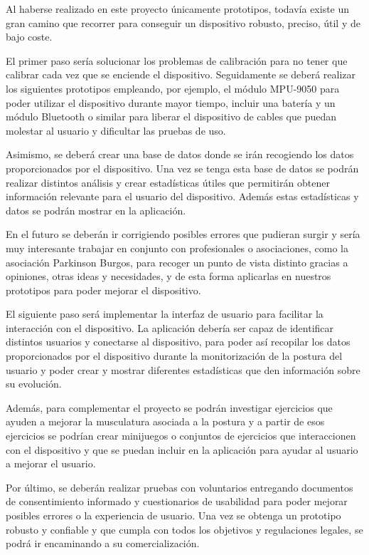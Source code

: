 

Al haberse realizado en este proyecto únicamente prototipos, todavía existe un gran camino que recorrer para conseguir un dispositivo robusto, preciso, útil y de bajo coste. 

El primer paso sería solucionar los problemas de calibración para no tener que calibrar cada vez que se enciende el dispositivo. Seguidamente se deberá realizar los siguientes prototipos empleando, por ejemplo, el módulo MPU-9050\cite{MPU9250_1,MPU9250_2} para poder utilizar el dispositivo durante mayor tiempo, incluir una batería y un módulo Bluetooth o similar para liberar el dispositivo de cables que puedan molestar al usuario y dificultar las pruebas de uso.

Asimismo, se deberá crear una base de datos donde se irán recogiendo los datos proporcionados por el dispositivo. Una vez se tenga esta base de datos se podrán realizar distintos análisis y crear estadísticas útiles que permitirán obtener información relevante para el usuario del dispositivo. Además estas estadísticas y datos se podrán mostrar en la aplicación.

En el futuro se deberán ir corrigiendo posibles errores que pudieran surgir y sería muy interesante trabajar en conjunto con profesionales o asociaciones, como la asociación Parkinson Burgos\cite{ParkinsonBurgos}, para recoger un punto de vista distinto gracias a opiniones, otras ideas y necesidades, y de esta forma aplicarlas en nuestros prototipos para poder mejorar el dispositivo.

El siguiente paso será implementar la interfaz de usuario para facilitar la interacción con el dispositivo. La aplicación debería ser capaz de identificar distintos usuarios y conectarse al dispositivo, para poder así recopilar los datos proporcionados por el dispositivo durante la monitorización de la postura del usuario y poder crear y mostrar diferentes estadísticas que den información sobre su evolución. 

Además, para complementar el proyecto se podrán investigar ejercicios que ayuden a mejorar la musculatura asociada a la postura y a partir de esos ejercicios se podrían crear minijuegos o conjuntos de ejercicios que interaccionen con el dispositivo y que se puedan incluir en la aplicación para ayudar al usuario a mejorar el usuario.

Por último, se deberán realizar pruebas con voluntarios entregando documentos de consentimiento informado y cuestionarios de usabilidad para poder mejorar posibles errores o la experiencia de usuario. Una vez se obtenga un prototipo robusto y confiable y que cumpla con todos los objetivos y regulaciones legales, se podrá ir encaminando a su comercialización. 

